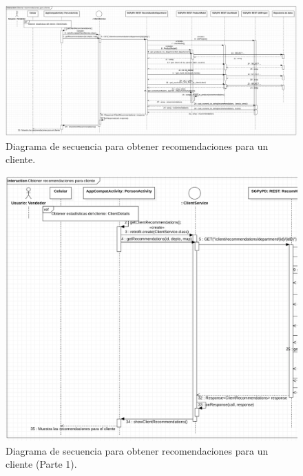 \FloatBarrier
\begin{figure}[htbp!]
		\centering
			\includegraphics[width=1 \textwidth]{imagenes/adrian/vendedor/prototipo3/obtenerRecomendaciones}
		\caption{Diagrama de secuencia para obtener recomendaciones para un cliente.}
		\label{secuencia-AIPV3-obtenRecom}
\end{figure}
\FloatBarrier

\FloatBarrier
\begin{figure}[htbp!]
		\centering
			\includegraphics[width=1 \textwidth]{imagenes/adrian/vendedor/prototipo3/obtenerRecomendaciones1}
		\caption{Diagrama de secuencia para obtener recomendaciones para un cliente (Parte 1).}
		\label{secuencia-AIPV3-obtenRecomUno}
\end{figure}
\FloatBarrier

